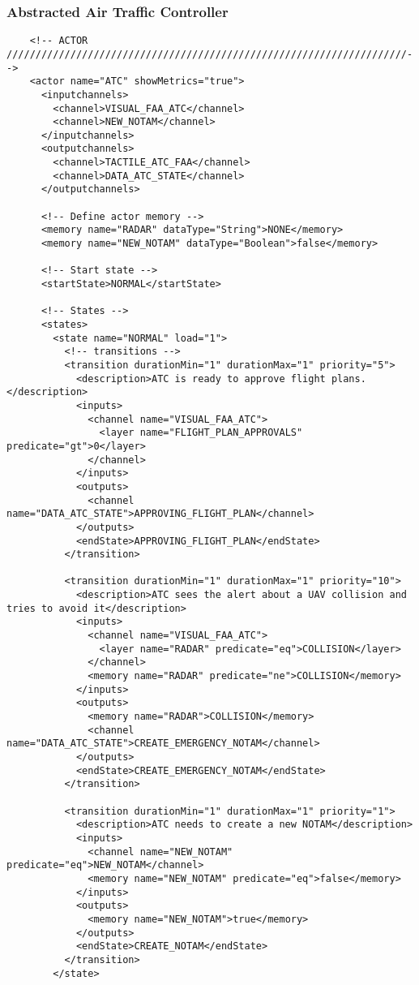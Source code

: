 \subsubsection{Abstracted Air Traffic Controller} 
\begin{verbatim}   
    <!-- ACTOR /////////////////////////////////////////////////////////////////////-->
    <actor name="ATC" showMetrics="true">
      <inputchannels>
        <channel>VISUAL_FAA_ATC</channel>
        <channel>NEW_NOTAM</channel>
      </inputchannels>
      <outputchannels>
        <channel>TACTILE_ATC_FAA</channel>
        <channel>DATA_ATC_STATE</channel>
      </outputchannels>
      
      <!-- Define actor memory -->
      <memory name="RADAR" dataType="String">NONE</memory>
      <memory name="NEW_NOTAM" dataType="Boolean">false</memory>
      
      <!-- Start state -->
      <startState>NORMAL</startState>
      
      <!-- States -->
      <states>
        <state name="NORMAL" load="1">
          <!-- transitions -->
          <transition durationMin="1" durationMax="1" priority="5">
            <description>ATC is ready to approve flight plans.</description>
            <inputs>
              <channel name="VISUAL_FAA_ATC">
                <layer name="FLIGHT_PLAN_APPROVALS" predicate="gt">0</layer>
              </channel>
            </inputs>
            <outputs>
              <channel name="DATA_ATC_STATE">APPROVING_FLIGHT_PLAN</channel>
            </outputs>
            <endState>APPROVING_FLIGHT_PLAN</endState>
          </transition>
 
          <transition durationMin="1" durationMax="1" priority="10">
            <description>ATC sees the alert about a UAV collision and tries to avoid it</description>
            <inputs>
              <channel name="VISUAL_FAA_ATC">
                <layer name="RADAR" predicate="eq">COLLISION</layer>
              </channel>
              <memory name="RADAR" predicate="ne">COLLISION</memory>
            </inputs>
            <outputs>
              <memory name="RADAR">COLLISION</memory>
              <channel name="DATA_ATC_STATE">CREATE_EMERGENCY_NOTAM</channel>
            </outputs>
            <endState>CREATE_EMERGENCY_NOTAM</endState>
          </transition>
          
          <transition durationMin="1" durationMax="1" priority="1">
            <description>ATC needs to create a new NOTAM</description>
            <inputs>
              <channel name="NEW_NOTAM" predicate="eq">NEW_NOTAM</channel>
              <memory name="NEW_NOTAM" predicate="eq">false</memory>
            </inputs>
            <outputs>
              <memory name="NEW_NOTAM">true</memory>
            </outputs>
            <endState>CREATE_NOTAM</endState>
          </transition>
        </state>
        

\end{verbatim}
